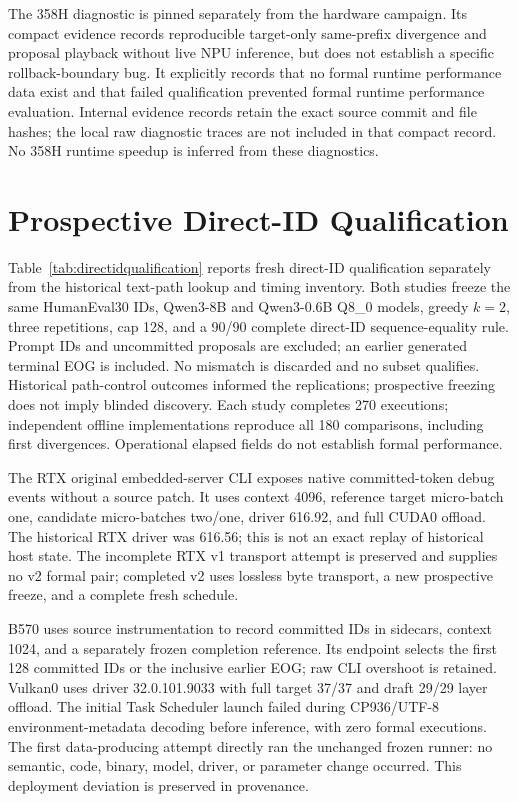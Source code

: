 \documentclass{article}
\begin{document}

The 358H diagnostic is pinned separately from the hardware campaign. Its compact evidence records reproducible target-only same-prefix divergence and proposal playback without live NPU inference, but does not establish a specific rollback-boundary bug. It explicitly records that no formal runtime performance data exist and that failed qualification prevented formal runtime performance evaluation. Internal evidence records retain the exact source commit and file hashes; the local raw diagnostic traces are not included in that compact record. No 358H runtime speedup is inferred from these diagnostics.
\section{Prospective Direct-ID Qualification}
Table~\ref{tab:directidqualification} reports fresh direct-ID qualification separately from the historical text-path lookup and timing inventory. Both studies freeze the same HumanEval30 IDs, Qwen3-8B and Qwen3-0.6B Q8\_0 models, greedy $k=2$, three repetitions, cap 128, and a 90/90 complete direct-ID sequence-equality rule. Prompt IDs and uncommitted proposals are excluded; an earlier generated terminal EOG is included. No mismatch is discarded and no subset qualifies. Historical path-control outcomes informed the replications; prospective freezing does not imply blinded discovery. Each study completes 270 executions; independent offline implementations reproduce all 180 comparisons, including first divergences. Operational elapsed fields do not establish formal performance.

The RTX original embedded-server CLI exposes native committed-token debug events without a source patch. It uses context 4096, reference target micro-batch one, candidate micro-batches two/one, driver 616.92, and full CUDA0 offload. The historical RTX driver was 616.56; this is not an exact replay of historical host state. The incomplete RTX v1 transport attempt is preserved and supplies no v2 formal pair; completed v2 uses lossless byte transport, a new prospective freeze, and a complete fresh schedule.

B570 uses source instrumentation to record committed IDs in sidecars, context 1024, and a separately frozen completion reference. Its endpoint selects the first 128 committed IDs or the inclusive earlier EOG; raw CLI overshoot is retained. Vulkan0 uses driver 32.0.101.9033 with full target 37/37 and draft 29/29 layer offload. The initial Task Scheduler launch failed during CP936/UTF-8 environment-metadata decoding before inference, with zero formal executions. The first data-producing attempt directly ran the unchanged frozen runner: no semantic, code, binary, model, driver, or parameter change occurred. This deployment deviation is preserved in provenance.
\end{document}
